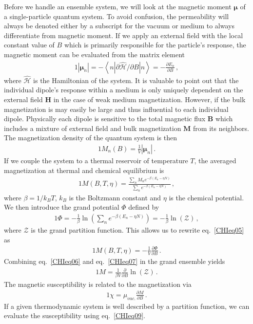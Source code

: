 Before we handle an ensemble system, we will look at the magnetic moment $\boldsymbol{\mu}$ of a single-particle quantum system. To avoid confusion, the permeability will always be denoted either by a subscript for the vacuum or medium to always differentiate from magnetic moment. If we apply an external field with the local constant value of $B$ which is primarily responsible for the particle's response, the magnetic moment can be evaluated from the matrix element
\begin{alignat}{1}
  \label{CHIeq03} \left|\boldsymbol{\mu}_{n}\right|=-\left\langle n\left|\partial\hat{\mathcal{H}}/\partial B\right|n\right\rangle=-\frac{\partial E_{n}}{\partial B}\,,
\end{alignat}
where $\hat{\mathcal{H}}$ is the Hamiltonian of the system. It is valuable to point out that the individual dipole's response within a medium is only uniquely dependent on the external field $\textbf{H}$ in the case of weak medium magnetization. However, if the bulk magnetization is may easily be large and thus influential to each individual dipole. Physically each dipole is sensitive to the total magnetic flux $\textbf{B}$ which includes a mixture of external field and bulk magnetization $\textbf{M}$ from its neighbors. The magnetization density of the quantum system is then
\begin{alignat}{1}
  \label{CHIeq04} M_{n}(B)=\frac{1}{V}\left|\boldsymbol{\mu}_{n}\right|\,.
\end{alignat}
If we couple the system to a thermal reservoir of temperature $T$, the averaged magnetization at thermal and chemical equilibrium is
\begin{alignat}{1}
  \label{CHIeq05} M(B,T,\eta)=\frac{\sum_{n}M_{n}e^{-\beta (E_{n}-\eta N)}}{\sum_{n}e^{-\beta (E_{n}-\eta N)}}\,,
\end{alignat}
where $\beta=1/k_{B}T$, $k_{B}$ is the Boltzmann constant and $\eta$ is the chemical potential. We then introduce the grand potential $\Phi$ defined by
\begin{alignat}{1}
  \label{CHIeq06} \Phi=-\frac{1}{\beta}\ln\left({\sum_{n}e^{-\beta (E_{n}-\eta N)}}\right)=-\frac{1}{\beta}\ln\left(\mathcal{Z}\right)\,,
\end{alignat}
where $\mathcal{Z}$ is the grand partition function. This allows us to rewrite eq.~\eqref{CHIeq05} as
\begin{alignat}{1}
  \label{CHIeq07} M(B,T,\eta)=-\frac{1}{V}\frac{\partial \Phi}{\partial B}\,.
\end{alignat}
Combining eq.~\eqref{CHIeq06} and eq.~\eqref{CHIeq07} in the grand ensemble yields
\begin{alignat}{1}
  \label{Mag} M=\frac{1}{\beta V}\frac{\partial}{\partial B}\ln\left(\mathcal{Z}\right)\,.
\end{alignat}
The magnetic susceptibility is related to the magnetization via
\begin{alignat}{1}
  \label{CHIeq09} \chi=\mu_{vac.}\frac{\partial M}{\partial B}\,.
\end{alignat}
If a given thermodynamic system is well described by a partition function, we can evaluate the susceptibility using eq.~\eqref{CHIeq09}.

